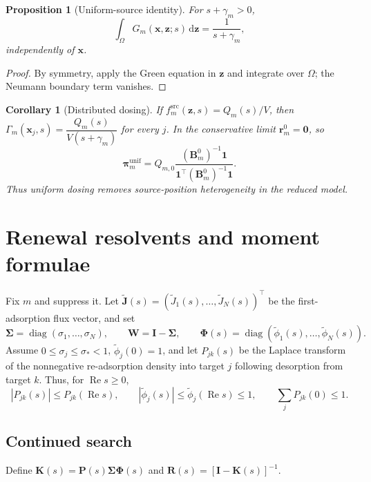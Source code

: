 \documentclass[pdflatex,sn-mathphys-num]{sn-jnl}
\numberwithin{equation}{section}
\theoremstyle{thmstyleone}%
\newtheorem{proposition}[theorem]{Proposition}
\newtheorem{corollary}[theorem]{Corollary}
\theoremstyle{definition}
\theoremstyle{remark}
\begin{document}
\begin{appendices}
\begin{proposition}[Uniform-source identity]
\label{prop:app_uniform_source}
For $s+\gamma_m>0$,
\[
\int_\Omega G_m(\mathbf x,\mathbf z;s)\,\mathrm d\mathbf z
=\frac1{s+\gamma_m},
\]
independently of $\mathbf x$.
\end{proposition}

\begin{proof}
By symmetry, apply the Green equation in $\mathbf z$ and integrate over
$\Omega$; the Neumann boundary term vanishes.
\end{proof}

\begin{corollary}[Distributed dosing]
\label{cor:app_uniform_dosing}
If $f_m^{\mathrm{src}}(\mathbf z,s)=Q_m(s)/V$, then
$\Gamma_m(\mathbf x_j,s)=\dfrac{Q_m(s)}{V(s+\gamma_m)}$ for every $j$.
In the conservative limit $\bm r_m^0=\mathbf0$, so
\[
\bm\pi_m^{\mathrm{unif}}=Q_{m,0}
\frac{(\mathbf B_m^0)^{-1}\mathbf1}
{\mathbf1^\top(\mathbf B_m^0)^{-1}\mathbf1}.
\]
Thus uniform dosing removes source-position heterogeneity in the reduced model.
\end{corollary}


\section{Renewal resolvents and moment formulae}
\label{app:renewal_resolvents}

Fix $m$ and suppress it. Let
$\widetilde{\mathbf J}(s)=(\widetilde J_1(s),\ldots,
\widetilde J_N(s))^\top$ be the first-adsorption flux vector, and set
\[
\bm\Sigma=\operatorname{diag}(\sigma_1,\ldots,\sigma_N),\qquad
\bm W=\mathbf I-\bm\Sigma,\qquad
\bm\Phi(s)=\operatorname{diag}(\widetilde\phi_1(s),\ldots,
\widetilde\phi_N(s)).
\]
Assume $0\leq\sigma_j\leq\sigma_*<1$, $\widetilde\phi_j(0)=1$, and let
$P_{jk}(s)$ be the Laplace transform of the nonnegative re-adsorption density
into target $j$ following desorption from target $k$. Thus, for
$\operatorname{Re}s\geq0$,
\[
|P_{jk}(s)|\leq P_{jk}(\operatorname{Re}s),\qquad
|\widetilde\phi_j(s)|\leq\widetilde\phi_j(\operatorname{Re}s)\leq1,
\qquad \sum_jP_{jk}(0)\leq1.
\]

\subsection{Continued search}

Define
$\mathbf K(s)=\mathbf P(s)\bm\Sigma\bm\Phi(s)$ and
$\mathbf R(s)=[\mathbf I-\mathbf K(s)]^{-1}$.


\end{appendices}
\end{document}
